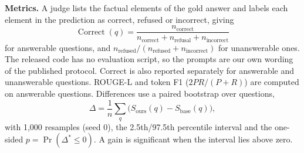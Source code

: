 \textbf{Metrics.} A judge lists the factual elements of the gold answer and labels each element in the prediction as correct, refused or incorrect, giving
\begin{equation}
  \operatorname{Correct}(q) = \frac{n_{\text{correct}}}{n_{\text{correct}} + n_{\text{refusal}} + n_{\text{incorrect}}}
  \label{eq:correct}
\end{equation}
for answerable questions, and $n_{\text{refused}}/(n_{\text{refused}} + n_{\text{incorrect}})$ for unanswerable ones. The released code has no evaluation script, so the prompts are our own wording of the published protocol. Correct is also reported separately for answerable and unanswerable questions. ROUGE-L and token F1 ($2PR/(P+R)$) are computed on answerable questions. Differences use a paired bootstrap over questions,
\begin{equation}
  \Delta = \frac{1}{n} \sum_q \big(S_{\text{ours}}(q) - S_{\text{base}}(q)\big),
  \label{eq:delta}
\end{equation}
with 1,000 resamples (seed 0), the 2.5th/97.5th percentile interval and the one-sided $p = \Pr(\Delta^* \le 0)$. A gain is significant when the interval lies above zero.
